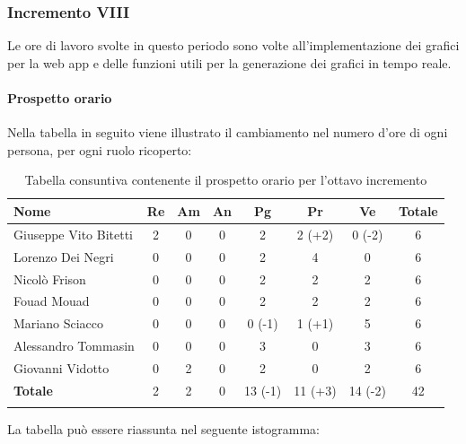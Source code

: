 		
		\subsubsection{Incremento VIII}
			Le ore di lavoro svolte in questo periodo sono volte all'implementazione dei grafici per la web app e delle funzioni utili per la generazione dei grafici in tempo reale.
		\paragraph{Prospetto orario}
			Nella tabella in seguito viene illustrato il cambiamento nel numero d'ore di ogni persona, per ogni ruolo ricoperto:
		
		\begin{longtable}{|l|c|c|c|c|c|c|c|}
			\hline
			\rowcolor{lighter-grayer}
			\textbf{Nome} & \textbf{Re} & \textbf{Am} & \textbf{An} & \textbf{Pg}  & \textbf{Pr}   & \textbf{Ve} & \textbf{Totale} \\
			\hline
			\endfirsthead
			
			\hline
			Giuseppe Vito Bitetti 		 & 2 & 0 & 0 & 2 & 2 (+2) & 0 (-2) & 6\\
			\hline
			\hline
			Lorenzo Dei Negri			 & 0 & 0 & 0 & 2 & 4 & 0 & 6\\
			\hline
			\hline
			Nicolò Frison				      & 0 & 0 & 0 & 2 & 2 & 2 & 6\\
			\hline
			\hline
			Fouad Mouad 				   & 0 & 0 & 0 & 2 & 2 & 2 & 6\\
			\hline
			\hline
			Mariano Sciacco 			 & 0 & 0 & 0 & 0 (-1) & 1 (+1) & 5 & 6\\
			\hline
			\hline
			Alessandro Tommasin    & 0 & 0 & 0 & 3 & 0 & 3 & 6\\
			\hline
			\hline
			Giovanni Vidotto 			  & 0 & 2 & 0 & 2 & 0 & 2 & 6\\
			\hline 
			\textbf{Totale}			 		 & 2 & 2 & 0 & 13 (-1) & 11 (+3) & 14 (-2) & 42\\
			\hline
			\caption{Tabella consuntiva contenente il prospetto orario per l'ottavo incremento}
		\end{longtable}
		
		La tabella può essere riassunta nel seguente istogramma:
		

